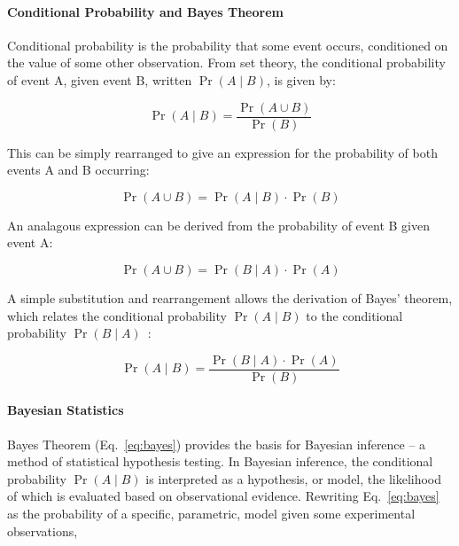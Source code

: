 
\paragraph{Conditional Probability and Bayes Theorem}
Conditional probability is the probability that some event occurs, conditioned on the value of some other observation. From set theory, the conditional probability of event A, given event B, written $\Pr(A \mid B)$, is given by: 

\begin{equation}
\Pr(A \mid B) = \frac{\Pr(A \cup B)}{\Pr(B)}
\label{eq:conditional}
\end{equation}

This can be simply rearranged to give an expression for the probability of both events A and B occurring:

\begin{equation}
\Pr(A \cup B) = \Pr(A \mid B) \cdot \Pr(B) 
\label{eq:conditional_and}
\end{equation}

An analagous expression can be derived from the probability of event B given event A:


\begin{equation}
\Pr(A \cup B) = \Pr(B \mid A) \cdot \Pr(A) 
\label{eq:conditional_and}
\end{equation}

A simple substitution and rearrangement allows the derivation of Bayes' theorem, which relates the conditional probability $\Pr(A \mid B)$ to the conditional probability $\Pr(B \mid A)$~\cite{barberBRML2012}:

\begin{equation}
\Pr(A \mid B) = \frac{\Pr(B \mid A) \cdot \Pr(A)}{\Pr(B)} 
\label{eq:bayes}
\end{equation}
 
\paragraph{Bayesian Statistics}
Bayes Theorem (Eq.~\ref{eq:bayes}) provides the basis for Bayesian inference -- a method of statistical hypothesis testing. In Bayesian inference, the conditional probability $\Pr(A \mid B)$ is interpreted as a hypothesis, or model, the likelihood of which is evaluated based on observational evidence. Rewriting Eq.~\ref{eq:bayes} as the probability of a specific, parametric, model given some experimental observations, 

